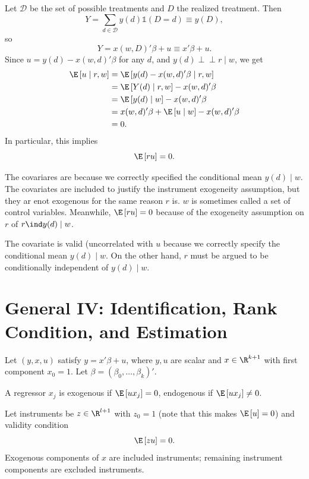 \begin{proposition}
	Let $\mathcal{D}$ be the set of possible treatments and $D$ the realized treatment. Then \[
		Y = \sum_{d \in \mathcal{D}} y(d)\mathds{1}(D=d) \equiv y(D)
	,\]
	so \[
		Y = x(w,D)'\beta + u \equiv x'\beta + u
	.\]
	Since $u=y(d)-x(w,d)'\beta$ for any $d$, and $y(d) \perp\!\!\!\perp r \mid w$, we get
	\begin{align*}
		\E\left[u \mid r,w\right] 
		&= \E\left[y (d) - x(w,d)' \beta \mid r,w\right]  \\
		&= \E\left[Y(d) \mid r,w\right] - x(w,d)'\beta \\
		&= \E\left[y(d) \mid w\right]  - x(w,d)'\beta \\
		&= x(w,d)'\beta + \E\left[ u \mid w\right] - x(w,d)'\beta \\
		&= 0
	.\end{align*}
	In particular, this implies \[
		\E\left[ru\right]=0
	.\]

	The covariares are  because we correctly specified the conditional mean $y(d) \mid w$. The covariates are included to justify the instrument exogeneity assumption, but they ar enot exogenous for the same reason $r$ is. $w$ is sometimes called a set of control variables.
	Meanwhile, $\E\left[ru\right] = 0 $ because of the exogeneity assumption on $r$ of $r \ind y(d) \mid w$.

	The covariate is valid (uncorrelated with $u$ because we correctly specify the conditional mean $y(d) \mid w$. On the other hand, $r$ must be argued to be conditionally independent of $y(d) \mid w$.
\end{proposition}

\section{General IV: Identification, Rank Condition, and Estimation}

\begin{definition}
	Let $(y,x,u)$ satisfy $y=x'\beta+u$, where $y,u$ are scalar and $x\in\R^{k+1}$ with first component $x_0=1$. Let $\beta=(\beta_0,\ldots,\beta_k)'$.

	A regressor $x_j$ is exogenous if $\E\left[ux_j\right]=0$, endogenous if $\E\left[ux_j\right]\ne 0$.

	Let instruments be $z\in\R^{l+1}$ with $z_0=1$ (note that this makes $\E\left[u \right] =0$) and validity condition \[
		\E\left[zu\right]=0
	.\]
	Exogenous components of $x$ are included instruments; remaining instrument components are excluded instruments.
\end{definition}

